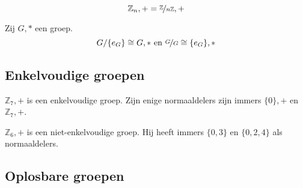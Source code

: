 \documentclass[main.tex]{subfiles}
\begin{document}
\begin{vb}
  \[ \mathbb{Z}_{n},+ = \nicefrac{\mathbb{Z}}{n\mathbb{Z}},+\]
\end{vb}

\begin{vb}
  Zij $G,*$ een groep.
  \[ G/\{ e_{G} \} \cong G,* \text{ en } \nicefrac{G}{G} \cong \{ e_{G}\},*\]
\end{vb}

\begin{vb}
\end{vb}

\begin{vb}
\end{vb}

\begin{vb}
\end{vb}

\subsection{Enkelvoudige groepen}

\begin{vb}
  $\mathbb{Z}_{7},+$ is een enkelvoudige groep.
  Zijn enige normaaldelers zijn immers $\{0\},+$ en $\mathbb{Z}_{7},+$.
\end{vb}

\begin{vb}
  $\mathbb{Z}_{6},+$ is een niet-enkelvoudige groep.
  Hij heeft immers $\{0,3\}$ en $\{0,2,4\}$ als normaaldelers.
\end{vb}

\subsection{Oplosbare groepen}
\label{sec:oplosbare-groepen}
\end{document}
